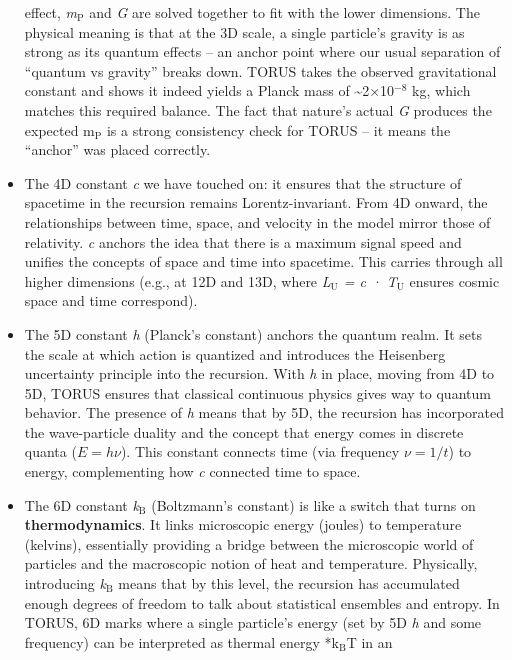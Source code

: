 \documentclass[]{article}
\newcommand{\subscript}[1]{\ensuremath{_{\mathrm{#1}}}}
\newcommand{\superscript}[1]{\ensuremath{^{\mathrm{#1}}}}
\begin{document}
\begin{itemize}
  effect,
  \emph{m\subscript{P}} and
  \emph{G} are solved together to fit with the lower dimensions. The
  physical meaning is that at the 3D scale, a single particle's gravity
  is as strong as its quantum effects -- an anchor point where our usual
  separation of ``quantum vs gravity'' breaks down. TORUS takes the
  observed gravitational constant and shows it indeed yields a Planck
  mass of \textasciitilde{}2×10\superscript{−8} kg, which matches this required
  balance. The fact that nature's actual \emph{G} produces the expected
  m\subscript{P} is a
  strong consistency check for TORUS​ -- it means the ``anchor'' was
  placed correctly.
\item
  The 4D constant \emph{c} we have touched on: it ensures that the
  structure of spacetime in the recursion remains Lorentz-invariant.
  From 4D onward, the relationships between time, space, and velocity in
  the model mirror those of relativity. \emph{c} anchors the idea that
  there is a maximum signal speed and unifies the concepts of space and
  time into spacetime. This carries through all higher dimensions (e.g.,
  at 12D and 13D, where
  \emph{L\subscript{U} = c
  · T\subscript{U}} ensures
  cosmic space and time correspond​).
\item
  The 5D constant \emph{h} (Planck's constant) anchors the quantum
  realm. It sets the scale at which action is quantized and introduces
  the Heisenberg uncertainty principle into the recursion. With \emph{h}
  in place, moving from 4D to 5D, TORUS ensures that classical
  continuous physics gives way to quantum behavior. The presence of
  \emph{h} means that by 5D, the recursion has incorporated the
  wave-particle duality and the concept that energy comes in discrete
  quanta ($E = h\nu$). This constant connects time (via frequency $\nu = 1/t$)
  to energy, complementing how \emph{c} connected time to space.
\item
  The 6D constant
  \emph{k\subscript{B}}
  (Boltzmann's constant) is like a switch that turns on
  \textbf{thermodynamics}. It links microscopic energy (joules) to
  temperature (kelvins), essentially providing a bridge between the
  microscopic world of particles and the macroscopic notion of heat and
  temperature. Physically, introducing
  \emph{k\subscript{B}}
  means that by this level, the recursion has accumulated enough degrees
  of freedom to talk about statistical ensembles and entropy. In TORUS,
  6D marks where a single particle's energy (set by 5D \emph{h} and some
  frequency) can be interpreted as thermal energy
  *k\subscript{B}T in an

\end{itemize}
\end{document}

